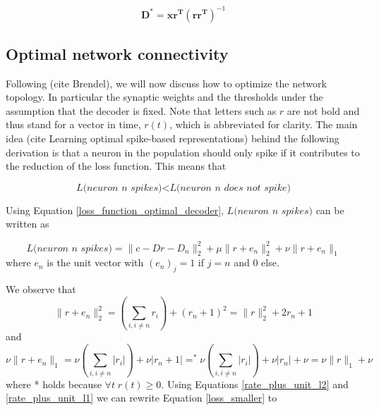 \documentclass[twoside,11pt]{article}
\begin{document}
\begin{equation} \label{optimal_decoder_no_lagrangian}
    \mathbf{D}^* = \mathbf{xr^T}(\mathbf{rr^T})^{-1}
\end{equation}


\subsection{Optimal network connectivity}
Following (cite Brendel), we will now discuss how to optimize the network topology.
In particular the synaptic weights and the thresholds
under the assumption that the decoder is fixed. Note that letters such as
$r$ are not bold and thus stand for a vector in time, $r(t)$, which is abbreviated for clarity.
The main idea (cite Learning optimal spike-based representations) behind the
following derivation is that a neuron in the population should only spike if it
contributes to the reduction of the loss function.
This means that

\begin{equation} \label{loss_smaller}
  \textit{L(neuron n spikes)} < \textit{L(neuron n does not spike)}
\end{equation}

Using Equation \ref{loss_function_optimal_decoder}, $\textit{L(neuron n spikes)}$ can be
written as

\begin{equation} \label{neuron_n_spiked_loss}
  \textit{L(neuron n spikes)}=\|c-Dr-D_n \|_2^2+\mu\|r+e_n\|^2_2+\nu\|r+e_n\|_1
\end{equation}
where $e_n$ is the unit vector with $(e_n)_j = 1$ if $j=n$ and 0 else.

We observe that
\begin{equation} \label{rate_plus_unit_l2}
  \|r+e_n\|^2_2 = (\sum_{i,i \neq n}r_i) + (r_n+1)^2 = \|r\|^2_2 + 2r_n + 1
\end{equation}
and
\begin{equation} \label{rate_plus_unit_l1}
  \nu \|r + e_n\|_1 = \nu (\sum_{i,i\neq n}|r_i|) + \nu |r_n+1| =^* \nu (\sum_{i,i\neq n}|r_i|) + \nu |r_n| +\nu = \nu \|r\|_1 + \nu  
\end{equation}
where * holds because $\forall t \; r(t) \geq 0$.
Using Equations \ref{rate_plus_unit_l2} and \ref{rate_plus_unit_l1} we can rewrite Equation
\ref{loss_smaller} to
\end{document}
